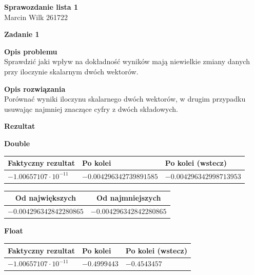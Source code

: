 \documentclass{article}
\begin{document}
\begin{center}
	\textbf{\LARGE Sprawozdanie lista 1} \\
	{\large Marcin Wilk 261722} \\

\end{center}

\noindent \textbf{\large Zadanie 1}

\noindent \textbf{Opis problemu} \\
Sprawdzić jaki wpływ na dokładność wyników mają niewielkie zmiany danych \\
przy iloczynie skalarnym dwóch wektorów.

\noindent \textbf{Opis rozwiązania} \\
Porównać wyniki iloczynu skalarnego dwóch wektorów, w drugim przypadku usuwając
najmniej znaczące cyfry z dwóch składowych.

\noindent \textbf{Rezultat}

\noindent \textbf{Double}

\begin{center}
	\begin{tabular}{|l|l|l|}
		\hline
		\textbf{Faktyczny rezultat} & \textbf{Po kolei}       & \textbf{Po kolei (wstecz)} \\
		\hline
		$-1.00657107\cdot10^{-11}$  & $-0.004296342739891585$ & $-0.004296342998713953$    \\
		\hline
	\end{tabular}
\end{center}

\begin{center}
	\begin{tabular}{|c|c|}
		\hline
		\textbf{Od największych} & \textbf{Od najmniejszych} \\
		\hline
		$-0.004296342842280865$  & $-0.004296342842280865$   \\
		\hline
	\end{tabular}
\end{center}

\noindent \textbf{Float}

\begin{center}
	\begin{tabular}{|l|l|l|}
		\hline
		\textbf{Faktyczny rezultat} & \textbf{Po kolei} & \textbf{Po kolei (wstecz)} \\
		\hline
		$-1.00657107\cdot10^{-11}$  & $-0.4999443$      & $-0.4543457$               \\
		\hline
	\end{tabular}
\end{center}
\end{document}
